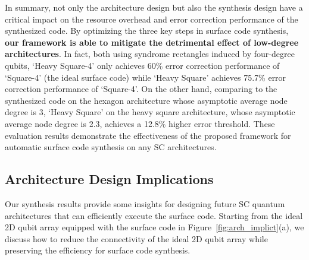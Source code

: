 In summary, not only the architecture design but also the synthesis design have a critical impact on the resource overhead and error correction performance of the synthesized code.
By optimizing the three key steps in surface code synthesis, \textbf{our framework is able to mitigate the detrimental effect of low-degree architectures}. In fact, 
both using syndrome rectangles induced by four-degree qubits, `\myCompilerNameSpace Heavy Square-4' only achieves 60\% error correction performance of `\myCompilerNameSpace Square-4' (the ideal surface code) while `\myCompilerNameSpace Heavy Square' achieves 75.7\% error correction performance of `\myCompilerNameSpace Square-4'. On the other hand, comparing to the synthesized code on the hexagon architecture whose asymptotic average node degree is 3, `\myCompilerNameSpace Heavy Square' on the heavy square architecture, whose asymptotic average node degree is 2.3, achieves a 12.8\% higher error threshold. These evaluation results demonstrate the effectiveness of the proposed framework for automatic surface code synthesis on any SC architectures.






\subsection{Architecture Design Implications}

Our synthesis results provide some insights for designing future SC quantum architectures that can efficiently execute the surface code. Starting from the ideal 2D qubit array equipped with the surface code in Figure~\ref{fig:arch_implict}(a),
we discuss how to reduce the connectivity of the ideal 2D qubit array while preserving the efficiency for surface code synthesis.

